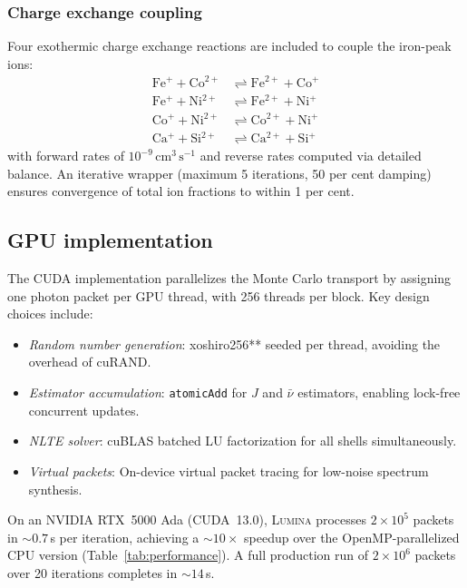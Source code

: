 \documentclass[fleqn,usenatbib]{mnras}
\newcommand{\lumina}{\textsc{Lumina}}
\begin{document}
\subsubsection{Charge exchange coupling}
\label{sec:ce}

Four exothermic charge exchange reactions are included to couple the iron-peak ions:
\begin{align}
\mathrm{Fe^+} + \mathrm{Co^{2+}} &\rightleftharpoons \mathrm{Fe^{2+}} + \mathrm{Co^+} \nonumber \\
\mathrm{Fe^+} + \mathrm{Ni^{2+}} &\rightleftharpoons \mathrm{Fe^{2+}} + \mathrm{Ni^+} \nonumber \\
\mathrm{Co^+} + \mathrm{Ni^{2+}} &\rightleftharpoons \mathrm{Co^{2+}} + \mathrm{Ni^+} \\
\mathrm{Ca^+} + \mathrm{Si^{2+}} &\rightleftharpoons \mathrm{Ca^{2+}} + \mathrm{Si^+} \nonumber
\end{align}
with forward rates of $10^{-9}\,\mathrm{cm^3\,s^{-1}}$ and reverse rates computed via detailed balance. An iterative wrapper (maximum 5 iterations, 50 per cent damping) ensures convergence of total ion fractions to within 1 per cent.

\subsection{GPU implementation}
\label{sec:gpu}

The CUDA implementation parallelizes the Monte Carlo transport by assigning one photon packet per GPU thread, with 256 threads per block. Key design choices include:
\begin{itemize}
    \item \textit{Random number generation}: xoshiro256** \citep{blackman2021} seeded per thread, avoiding the overhead of cuRAND.
    \item \textit{Estimator accumulation}: \texttt{atomicAdd} for $J$ and $\bar{\nu}$ estimators, enabling lock-free concurrent updates.
    \item \textit{NLTE solver}: cuBLAS batched LU factorization for all shells simultaneously.
    \item \textit{Virtual packets}: On-device virtual packet tracing for low-noise spectrum synthesis.
\end{itemize}

On an NVIDIA RTX~5000 Ada (CUDA~13.0), \lumina{} processes $2\times10^5$ packets in ${\sim}0.7$\,s per iteration, achieving a ${\sim}10\times$ speedup over the OpenMP-parallelized CPU version (Table~\ref{tab:performance}). A full production run of $2\times10^6$ packets over 20 iterations completes in ${\sim}14$\,s.
\end{document}
